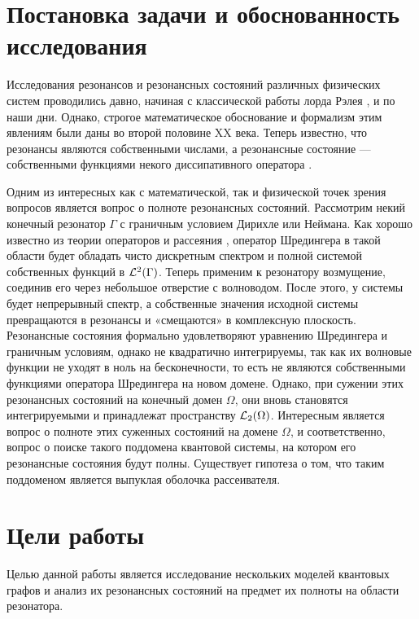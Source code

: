 \startprefacepage

\section*{Постановка задачи и обоснованность исследования}

Исследования резонансов и резонансных состояний различных физических систем проводились давно, начиная с классической работы лорда Рэлея \cite{rayleigh1916theory}, и по наши дни. Однако, строгое математическое обоснование и формализм этим явлениям были даны во второй половине XX века. Теперь известно, что резонансы являются собственными числами, а резонансные состояние — собственными функциями некого диссипативного оператора \cite{lax1990scattering, adamjan1965class}.

Одним из интересных как с математической, так и физической точек зрения вопросов является вопрос о полноте резонансных состояний. Рассмотрим некий конечный резонатор $\Gamma$ с граничным условием Дирихле или Неймана. Как хорошо известно из теории операторов и рассеяния \cite{reed1980methods}, оператор Шредингера в такой области будет обладать чисто дискретным спектром и полной системой собственных функций в $\mathcal{L}^2(\Gamma)$. Теперь применим к резонатору возмущение, соединив его через небольшое отверстие с волноводом. После этого, у системы будет непрерывный спектр, а собственные значения исходной системы превращаются в резонансы и «смещаются» в комплексную плоскость. Резонансные состояния формально удовлетворяют уравнению Шредингера и граничным условиям, однако не квадратично интегрируемы, так как их волновые функции не уходят в ноль на бесконечности, то есть не являются собственными функциями оператора Шредингера на новом домене. Однако, при сужении этих резонансных состояний на конечный домен $\Omega$, они вновь становятся интегрируемыми и принадлежат пространству $\mathcal{L}_2(\Omega)$. Интересным является вопрос о полноте этих суженных состояний на домене $\Omega$, и соответственно, вопрос о поиске такого поддомена квантовой системы, на котором его резонансные состояния будут полны. Существует гипотеза о том, что таким поддоменом является выпуклая оболочка рассеивателя.

\section*{Цели работы}
Целью данной работы является исследование нескольких моделей квантовых графов и анализ их резонансных состояний на предмет их полноты на области резонатора.

